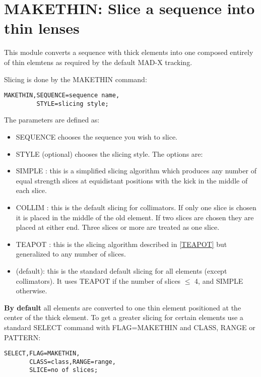 
\chapter{MAKETHIN: Slice a sequence into thin lenses}

This module converts a sequence with thick elements into one composed entirely of thin elemtens as required by the default MAD-X tracking. 
 
Slicing is done by the MAKETHIN command: 
\begin{verbatim}
MAKETHIN,SEQUENCE=sequence name,
         STYLE=slicing style;
\end{verbatim} 

The parameters are defined as: 
\begin{itemize}
	\item SEQUENCE chooses the sequence you wish to slice. 
	\item STYLE (optional) chooses the slicing style. The options are:   
	\item SIMPLE : this is a simplified slicing algorithm which produces any number of equal strength slices at equidistant positions with the kick in the middle of each slice.     
	\item COLLIM : this is the default slicing for collimators. If only one slice is  chosen it is placed in the middle of the old element. If two slices are chosen they  are placed at either end. Three slices or more are treated as one slice.     
	\item TEAPOT : this is the slicing algorithm described in \href{../Introduction/bibliography.html#TEAPOT}{[TEAPOT]} but generalized to any number of slices.     
	\item      (default): this is the standard default slicing for all elements (except collimators). It uses TEAPOT if the number of slices $\leq$ 4, and SIMPLE otherwise.    
\end{itemize}
\textbf{By default} all elements are converted to one thin element positioned at the center of  the thick element. To get a greater slicing for certain elements use a standard SELECT command with FLAG=MAKETHIN and  CLASS, RANGE or PATTERN: 

\begin{verbatim}
SELECT,FLAG=MAKETHIN,
       CLASS=class,RANGE=range,
       SLICE=no of slices;
\end{verbatim}

